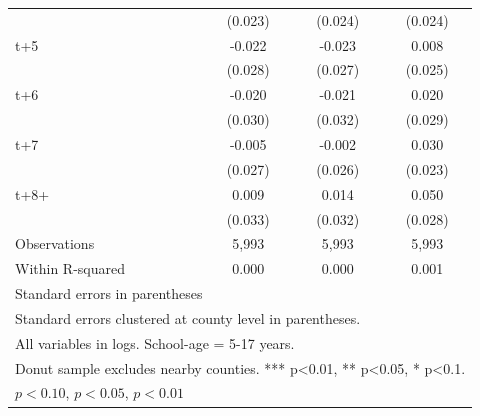 \begin{table}[htbp]
\begin{tabular}{l*{3}{c}}
            &     (0.023)         &     (0.024)         &     (0.024)         \\
[1em]
t+5         &      -0.022         &      -0.023         &       0.008         \\
            &     (0.028)         &     (0.027)         &     (0.025)         \\
[1em]
t+6         &      -0.020         &      -0.021         &       0.020         \\
            &     (0.030)         &     (0.032)         &     (0.029)         \\
[1em]
t+7         &      -0.005         &      -0.002         &       0.030         \\
            &     (0.027)         &     (0.026)         &     (0.023)         \\
[1em]
t+8+        &       0.009         &       0.014         &       0.050\sym{*}  \\
            &     (0.033)         &     (0.032)         &     (0.028)         \\
\hline
Observations&       5,993         &       5,993         &       5,993         \\
Within R-squared&       0.000         &       0.000         &       0.001         \\
\hline\hline
\multicolumn{4}{l}{\footnotesize Standard errors in parentheses}\\
\multicolumn{4}{l}{\footnotesize Standard errors clustered at county level in parentheses.}\\
\multicolumn{4}{l}{\footnotesize All variables in logs. School-age = 5-17 years.}\\
\multicolumn{4}{l}{\footnotesize Donut sample excludes nearby counties. *** p<0.01, ** p<0.05, * p<0.1.}\\
\multicolumn{4}{l}{\footnotesize \sym{*} \(p<0.10\), \sym{**} \(p<0.05\), \sym{***} \(p<0.01\)}\\
\end{tabular}
\end{table}
